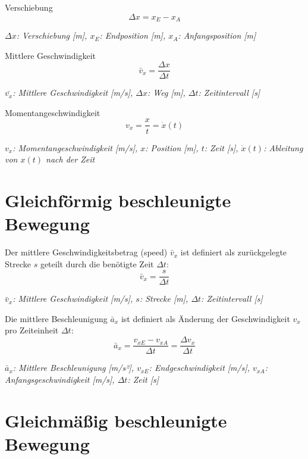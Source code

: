 \documentclass[a4paper,10pt]{article}
\newenvironment{displayformula}
{
	\begin{framed}
		\color{formulaColor}
	}
	{\end{framed}}
\newcommand{\formulalegend}[1]{%
	\par\vspace{0.5ex}%
	{{\color{legendColor}\RaggedRight\small\textit{#1}}}%
	\par\vspace{1.5ex}%
}
\begin{document}
\begin{displayformula}
	Verschiebung
	\[
	\Delta x = x_E - x_A
	\]
\end{displayformula}
\formulalegend{
	\( \Delta x \): Verschiebung [m], \( x_E \): Endposition [m], \( x_A \): Anfangsposition [m]
}

\begin{displayformula}
	Mittlere Geschwindigkeit
	\[
	\bar{v}_x = \frac{\Delta x}{\Delta t}
	\]
\end{displayformula}
\formulalegend{
	\( \bar{v_x} \): Mittlere Geschwindigkeit [m/s], \( \Delta x \): Weg [m], \( \Delta t \): Zeitintervall [s]
}

\begin{displayformula}
	Momentangeschwindigkeit
	\[
	v_x = \dfrac{x}{t} = \dot{x} (t)
	\]
\end{displayformula}
\formulalegend{
	\( v_x \): Momentangeschwindigkeit [m/s], \( x \): Position [m], \( t \): Zeit [s], \( \dot{x}(t) \): Ableitung von \( x(t) \) nach der Zeit
}



\section{Gleichförmig beschleunigte Bewegung}

\begin{displayformula}
	Der mittlere Geschwindigkeitsbetrag (speed) \( \bar{v}_x \) ist definiert als zurückgelegte Strecke \( s \) geteilt durch die benötigte Zeit \( \Delta t \):
	\[
	\bar{v}_x = \frac{s}{\Delta t}
	\]
\end{displayformula}
\formulalegend{
	\( \bar{v}_x \): Mittlere Geschwindigkeit [m/s], \( s \): Strecke [m], \( \Delta t \): Zeitintervall [s]
}

\begin{displayformula}
	Die mittlere Beschleunigung \( \bar{a}_x \) ist definiert als Änderung der Geschwindigkeit \( v_x \) pro Zeiteinheit \( \Delta t \):
	\[
	\bar{a}_x = \frac{v_{xE} - v_{xA}}{\Delta t} = \frac{\Delta v_x}{\Delta t}
	\]
\end{displayformula}
\formulalegend{
	\( \bar{a}_x \): Mittlere Beschleunigung [m/s²], \( v_{xE} \): Endgeschwindigkeit [m/s], \( v_{xA} \): Anfangsgeschwindigkeit [m/s], \( \Delta t \): Zeit [s]
}



\section{Gleichmäßig beschleunigte Bewegung}
\end{document}

